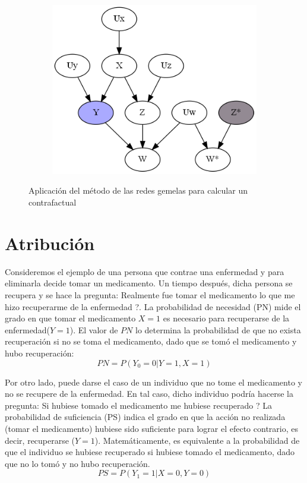 \begin{figure}
\begin{subfigure}{0.49\linewidth}
		\includegraphics[width=\linewidth]{./images/Chapter 2/count-tn-5.png}
		\caption{}
		\label{fig:count-tn-e}
	\end{subfigure}			
	\caption{Aplicación del método de las redes gemelas para calcular un contrafactual}
	\label{fig:count-tn}
\end{figure}

\section{Atribución} \label{sec:attr}
Consideremos el ejemplo de una persona que contrae una enfermedad y para eliminarla decide tomar un medicamento. Un tiempo después, dicha persona se recupera y se hace la pregunta: \textquestiondown Realmente fue tomar el medicamento lo que me hizo recuperarme de la enfermedad ?. La probabilidad de necesidad (PN) mide el grado en que tomar el medicamento $X=1$ es necesario para recuperarse de la enfermedad($Y=1$). El valor de $PN$ lo determina la probabilidad de que no exista recuperación si no se toma el medicamento, dado que se tomó el medicamento y hubo recuperación:
\[PN=P(Y_0=0|Y=1,X=1)\]

Por otro lado, puede darse el caso de un individuo que no tome el medicamento y no se recupere de la enfermedad. En tal caso, dicho individuo podría hacerse la pregunta: \textquestiondown Si hubiese tomado el medicamento me hubiese recuperado ?  La probabilidad de suficiencia (PS) indica el grado en que la acción no realizada (tomar el medicamento) hubiese sido suficiente para lograr el efecto contrario, es decir, recuperarse ($Y=1$). Matemáticamente, es equivalente a la probabilidad de que el individuo se hubiese recuperado si hubiese tomado el medicamento, dado que no lo tomó y no hubo recuperación.
\[PS = P(Y_1=1|X=0,Y=0)\]

